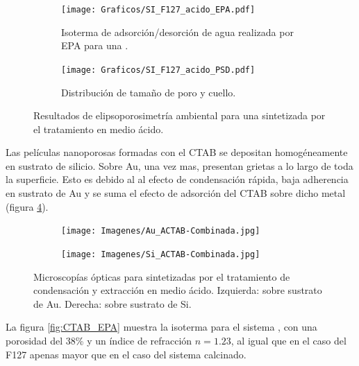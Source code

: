 {		\begin{figure}[!ht]
		  	\begin{subfigure}[t]{0.495\textwidth}
		  	\texttt{[image: Graficos/SI\_F127\_acido\_EPA.pdf]}
			\caption{Isoterma de adsorción/desorción de agua realizada por EPA para una \pdmF.}
			\label{fig:F127_acido_EPA}
			\end{subfigure}
			\begin{subfigure}[t]{0.495\textwidth}
		  	\texttt{[image: Graficos/SI\_F127\_acido\_PSD.pdf]}
			\caption{Distribución de tamaño de poro y cuello.\\ }
			\label{fig:F127_acido_PSD}
			\end{subfigure}
			\caption[Elipsoporosimetría \pdmF\space tratamiento ácido.]{Resultados de elipsoporosimetría ambiental para una \pdmF\space sintetizada por el tratamiento en medio ácido.}
			\end{figure}

		Las películas nanoporosas formadas con el CTAB se depositan homogéneamente en sustrato de silicio. Sobre Au, una vez mas, presentan grietas a lo largo de toda la superficie. Esto es debido al al efecto de condensación rápida, baja adherencia en sustrato de Au y se suma el efecto de adsorción del CTAB sobre dicho metal (figura \ref{fig:Microscopia_CTAB_acido}). 

		\begin{figure}[!th]
 	   	    \begin{subfigure}[t]{0.49\textwidth}
	       	\texttt{[image: Imagenes/Au\_ACTAB-Combinada.jpg]}
	   		\end{subfigure}
	   		\begin{subfigure}[t]{0.49\textwidth}
	   	    \texttt{[image: Imagenes/Si\_ACTAB-Combinada.jpg]}
	   		\end{subfigure}
			 \caption[Microscopía óptica \pdmC tratamiento en medio ácido.]{Microscopías ópticas para \pdmC\space sintetizadas por el tratamiento de condensación y extracción en medio ácido. Izquierda: sobre sustrato de Au. Derecha: sobre sustrato de Si.}
			 \label{fig:Microscopia_CTAB_acido}	
		     \end{figure}	

		La figura \ref{fig:CTAB_EPA} muestra la isoterma para el sistema \pdmC, con una porosidad del 38\% y un índice de refracción $n=1.23$, al igual que en el caso del F127 apenas mayor que en el caso del sistema calcinado.

}
